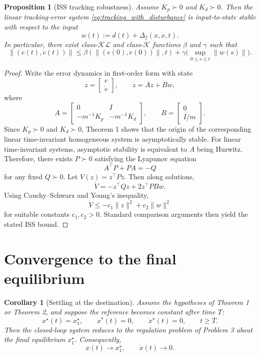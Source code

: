 \documentclass[11pt]{article}
\newtheorem{proposition}{Proposition}
\newtheorem{corollary}{Corollary}
\theoremstyle{definition}
\begin{document}
\begin{proposition}[ISS tracking robustness]
Assume $K_p\succ0$ and $K_d\succ0$. Then the linear tracking-error system \eqref{eq:tracking_with_disturbance} is input-to-state stable with respect to the input
\[
 w(t):=d(t)+\Delta_f(x,\dot x,t).
\]
In particular, there exist class-$\mathcal{KL}$ and class-$\mathcal{K}$ functions $\beta$ and $\gamma$ such that
\[
 \|(e(t),\dot e(t))\|
 \le
 \beta(\|(e(0),\dot e(0))\|,t)
 +
 \gamma\Big(\sup_{0\le s\le t}\|w(s)\|\Big).
\]
\end{proposition}

\begin{proof}
Write the error dynamics in first-order form with state
\[
 z=
 \begin{bmatrix}
 e\\ \dot e
 \end{bmatrix},
 \qquad
 \dot z = A z + B w,
\]
where
\[
 A=
 \begin{bmatrix}
 0 & I\\
 -m^{-1}K_p & -m^{-1}K_d
 \end{bmatrix},
 \qquad
 B=
 \begin{bmatrix}
 0\\ I/m
 \end{bmatrix}.
\]
Since $K_p\succ0$ and $K_d\succ0$, Theorem 1 shows that the origin of the corresponding linear time-invariant homogeneous system is asymptotically stable. For linear time-invariant systems, asymptotic stability is equivalent to $A$ being Hurwitz. Therefore, there exists $P\succ0$ satisfying the Lyapunov equation
\[
 A^\top P + PA = -Q
\]
for any fixed $Q\succ0$. Let $V(z)=z^\top Pz$. Then along solutions,
\[
 \dot V = -z^\top Qz + 2z^\top P B w.
\]
Using Cauchy--Schwarz and Young's inequality,
\[
 \dot V \le -c_1\|z\|^2 + c_2\|w\|^2
\]
for suitable constants $c_1,c_2>0$. Standard comparison arguments then yield the stated ISS bound.
\end{proof}

\section{Convergence to the final equilibrium}

\begin{corollary}[Settling at the destination]
Assume the hypotheses of Theorem 1 or Theorem 2, and suppose the reference becomes constant after time $T$:
\[
 x^\star(t)=x_1^\star,
 \qquad
 \dot x^\star(t)=0,
 \qquad
 \ddot x^\star(t)=0,
 \qquad t\ge T.
\]
Then the closed-loop system reduces to the regulation problem of Problem 3 about the final equilibrium $x_1^\star$. Consequently,
\[
 x(t)\to x_1^\star,
 \qquad
 \dot x(t)\to0.
\]
\end{corollary}
\end{document}
